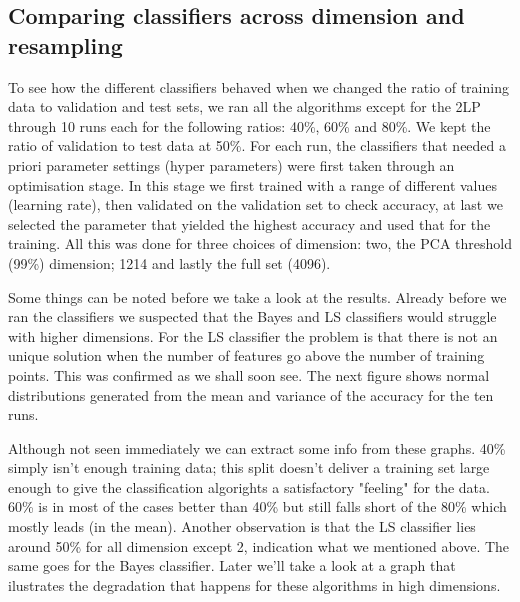 \documentclass[12pt, a4paper]{article}
\begin{document}
\subsection{Comparing classifiers across dimension and resampling }
To see how the different classifiers behaved when we changed the ratio of training data to  validation and test sets, we ran all the algorithms except for the 2LP through 10 runs each for the following ratios: 40\%, 60\% and 80\%. We kept the ratio of validation to test data at 50\%. For each run, the classifiers that needed a priori parameter settings (hyper parameters) were first taken through an optimisation stage. In this stage we first trained with a range of different values (learning rate), then validated on the validation set to check accuracy, at last we selected the parameter that yielded the highest accuracy and used that for the training. All this was done for three choices of dimension: two, the PCA threshold (99\%)  dimension; 1214 and lastly the full set (4096).

Some things can be noted before we take a look at the results. Already before we ran the classifiers we suspected that the Bayes and LS classifiers would struggle with higher dimensions. For the LS classifier the problem is that there is not an unique solution when the number of features go above the number of training points. This was confirmed as we shall soon see. The next figure shows normal distributions generated from the mean and variance of the accuracy for the ten runs.

Although not seen immediately we can extract some info from these graphs. 40\% simply isn't enough training data; this split doesn't deliver a training set large enough to give the classification algorights a satisfactory "feeling" for the data. 60\% is in most of the cases better than 40\% but still falls short of the 80\% which mostly leads (in the mean). Another observation is that the LS classifier lies around 50\% for all dimension except 2, indication what we mentioned above. The same goes for the Bayes classifier. Later we'll take a look at a graph that ilustrates the degradation that happens for these algorithms in high dimensions.
\end{document}
